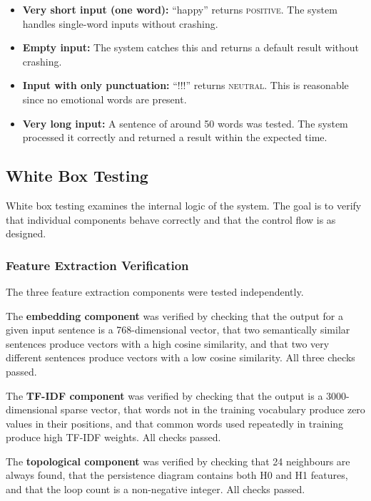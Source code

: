 \begin{itemize}
    \item \textbf{Very short input (one word):} ``happy'' returns \textsc{positive}. The system
    handles single-word inputs without crashing.
    \item \textbf{Empty input:} The system catches this and returns a default result without
    crashing.
    \item \textbf{Input with only punctuation:} ``!!!'' returns \textsc{neutral}. This is
    reasonable since no emotional words are present.
    \item \textbf{Very long input:} A sentence of around 50 words was tested. The system
    processed it correctly and returned a result within the expected time.
\end{itemize}

\subsection{White Box Testing}

White box testing examines the internal logic of the system. The goal is to verify that
individual components behave correctly and that the control flow is as designed.

\subsubsection*{Feature Extraction Verification}

The three feature extraction components were tested independently.

The \textbf{embedding component} was verified by checking that the output for a given input
sentence is a 768-dimensional vector, that two semantically similar sentences produce vectors
with a high cosine similarity, and that two very different sentences produce vectors with a low
cosine similarity. All three checks passed.

The \textbf{TF-IDF component} was verified by checking that the output is a 3000-dimensional
sparse vector, that words not in the training vocabulary produce zero values in their positions,
and that common words used repeatedly in training produce high TF-IDF weights. All checks
passed.

The \textbf{topological component} was verified by checking that 24 neighbours are always
found, that the persistence diagram contains both H0 and H1 features, and that the loop count
is a non-negative integer. All checks passed.


